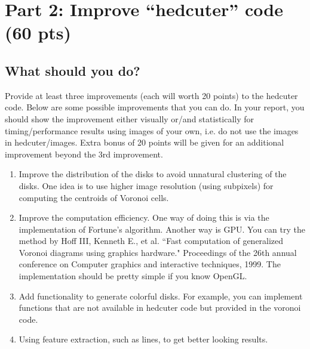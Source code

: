 \documentclass[11pt]{article}
\begin{document}
\section{Part 2: Improve  ``hedcuter'' code (60 pts)}


\subsection{What should  you do?}

Provide at least three improvements (each will worth 20 points) to the hedcuter code. Below are some possible improvements that 
you can do. In your report, you should show the improvement either visually or/and statistically for timing/performance results
using images of your own, i.e. do not use the images in hedcuter/images. 
Extra bonus of 20 points will be given for an additional improvement beyond the 3rd improvement.
\begin{enumerate}

\item Improve the distribution of the disks to avoid unnatural clustering of the disks. One idea is to use higher
image resolution (using subpixels) for computing the centroids of Voronoi cells. 

\item Improve the computation efficiency. One way of doing this is via  the implementation of Fortune's algorithm. Another way is GPU. You can try the method by Hoff III, Kenneth E., et al. ``Fast computation of generalized Voronoi diagrams using graphics hardware." Proceedings of the 26th annual conference on Computer graphics and interactive techniques, 1999. The implementation should be pretty simple if you know OpenGL.

\item Add functionality to generate colorful disks. For example, you can implement functions that are not available in hedcuter code but provided in the voronoi code.

\item Using feature extraction, such as lines, to get better looking results.

\end{enumerate}




\end{document}
